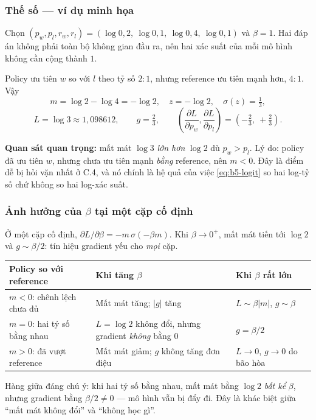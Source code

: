\subsubsection{Thế số --- ví dụ minh họa}

Chọn $(p_w,p_l,r_w,r_l)=(\log 0{,}2,\ \log 0{,}1,\ \log 0{,}4,\ \log 0{,}1)$ và
$\beta=1$. Hai đáp án không phải toàn bộ không gian đầu ra, nên hai xác suất của
mỗi mô hình không cần cộng thành $1$.

Policy ưu tiên $w$ so với $l$ theo tỷ số $2:1$, nhưng reference ưu tiên mạnh hơn,
$4:1$. Vậy
\[
  m=\log 2-\log 4=-\log 2,\quad z=-\log 2,\quad \sigma(z)=\tfrac13,
\]
\[
  \boxed{L=\log 3\approx 1{,}098612},\qquad
  g=\tfrac23,\qquad
  \left(\frac{\partial L}{\partial p_w},\frac{\partial L}{\partial p_l}\right)
   =\left(-\tfrac23,\ +\tfrac23\right).
\]

\textbf{Quan sát quan trọng:} mất mát $\log 3$ \emph{lớn hơn} $\log 2$ dù
$p_w>p_l$. Lý do: policy đã ưu tiên $w$, nhưng chưa ưu tiên mạnh \emph{bằng}
reference, nên $m<0$. Đây là điểm dễ bị hỏi vặn nhất ở C.4, và nó chính là hệ quả
của việc \eqref{eq:b5-logit} so hai log-tỷ số chứ không so hai log-xác suất.

\subsubsection{Ảnh hưởng của $\beta$ tại một cặp cố định}

Ở một cặp cố định, $\partial L/\partial\beta=-m\,\sigma(-\beta m)$. Khi
$\beta\to0^+$, mất mát tiến tới $\log 2$ và $g\sim\beta/2$: tín hiệu gradient yếu
cho \emph{mọi} cặp.

\begin{center}
\begin{tabular}{p{}p{}p{}}
\toprule
\textbf{Policy so với reference} & \textbf{Khi tăng $\beta$} & \textbf{Khi $\beta$ rất lớn}\\
\midrule
$m<0$: chênh lệch chưa đủ & Mất mát tăng; $|g|$ tăng & $L\sim\beta|m|$, $g\sim\beta$\\
$m=0$: hai tỷ số bằng nhau & $L=\log2$ không đổi, nhưng gradient \emph{không} bằng $0$ & $g=\beta/2$\\
$m>0$: đã vượt reference & Mất mát giảm; $g$ không tăng đơn điệu & $L\to0$, $g\to0$ do bão hòa\\
\bottomrule
\end{tabular}
\end{center}

Hàng giữa đáng chú ý: khi hai tỷ số bằng nhau, mất mát bằng $\log 2$ \emph{bất kể}
$\beta$, nhưng gradient bằng $\beta/2\ne0$ --- mô hình vẫn bị đẩy đi. Đây là khác
biệt giữa ``mất mát không đổi'' và ``không học gì''.

